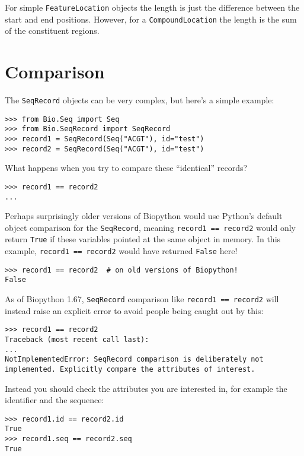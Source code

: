 For simple \verb|FeatureLocation| objects the length is just
the difference between the start and end positions. However,
for a \verb|CompoundLocation| the length is the sum of the
constituent regions.

\section{Comparison}

The \verb|SeqRecord| objects can be very complex, but here's a simple example:

\begin{verbatim}
>>> from Bio.Seq import Seq
>>> from Bio.SeqRecord import SeqRecord
>>> record1 = SeqRecord(Seq("ACGT"), id="test")
>>> record2 = SeqRecord(Seq("ACGT"), id="test")
\end{verbatim}

What happens when you try to compare these ``identical'' records?

\begin{verbatim}
>>> record1 == record2
...
\end{verbatim}

Perhaps surprisingly older versions of Biopython would use Python's default object
comparison for the \verb|SeqRecord|, meaning \verb|record1 == record2| would
only return \verb|True| if these variables pointed at the same object in memory.
In this example, \verb|record1 == record2| would have returned \verb|False|
here!

\begin{verbatim}
>>> record1 == record2  # on old versions of Biopython!
False
\end{verbatim}

As of Biopython 1.67, \verb|SeqRecord| comparison like \verb|record1 == record2|
will instead raise an explicit error to avoid people being caught out by this:

\begin{verbatim}
>>> record1 == record2
Traceback (most recent call last):
...
NotImplementedError: SeqRecord comparison is deliberately not implemented. Explicitly compare the attributes of interest.
\end{verbatim}

Instead you should check the attributes you are interested in, for example the
identifier and the sequence:

\begin{verbatim}
>>> record1.id == record2.id
True
>>> record1.seq == record2.seq
True
\end{verbatim}

